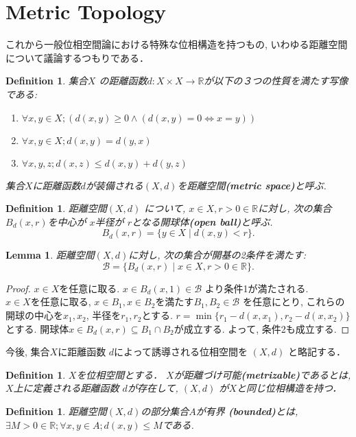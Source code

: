 \documentclass[lualatex]{ltjsbook}
\newtheorem{lemma}[theorem]{Lemma}
\newtheorem{definition}[theorem]{Definition}
\theoremstyle{remark}
\theoremstyle{plain}
\begin{document}
\section{Metric Topology}
これから一般位相空間論における特殊な位相構造を持つもの,  
いわゆる距離空間について議論するつもりである．


\begin{definition}
	集合$X$ の距離函数$d : X \times X \to \mathbb{R}$が以下の３つの性質を満たす写像である:
	\begin{enumerate}
		\item $\forall x  ,  y \in X ; \left( d(x, y) \ge 0 \land \left( d(x, y) = 0  \iff x = y \right) \right)$ 
		\item $\forall x,  y \in X; d(x, y) = d(y, x)$
		\item  $\forall x, y, z ; d(x, z) \le d(x, y) + d(y, z)$
	\end{enumerate}
	集合$X$に距離函数$d$が装備される$(X, d)$を距離空間\textbf{(metric space)}と呼ぶ.
\end{definition}

\begin{definition}
	距離空間$\left( X, d \right) $ について,  $x \in X,  r>0 \in  \mathbb{R}$に対し,  次の集合$B_d (x, r)$を中心が $x$半径が $r$となる開球体\textbf{(open ball)}と呼ぶ.
	 \[
	B_d(x, r) = \{y \in X \mid d(x, y) <r\} 
	.\] 
\end{definition}

\begin{lemma}
	距離空間$(X, d)$に対し,  次の集合が開基の2条件を満たす:
	 \[
	 \mathcal{B} = \{ B_d(x, r)  \mid  x \in X,  r >0 \in \mathbb{R}\} 
	 .\] 
\end{lemma}

\begin{proof}
	$x \in X$を任意に取る.  $x \in B_d(x, 1) \in \mathcal{B}$ より条件1が満たされる.\\
	$x \in X$を任意に取る,   $x \in B_1,  x \in B_2$を満たす$B_1, B_2 \in \mathcal{B}$ を任意にとり,  これらの開球の中心を$x_1, x_2$, 半径を$r_1, r_2$とする. $r = \min \{ r_1 - d(x, x_1),  r_2 -d(x, x_2)\} $ とする. 開球体$ x \in B_d(x, r) \subseteq  B_1 \cap B_2$が成立する. よって,  条件2も成立する.
\end{proof}

今後,  集合$X$に距離函数 $d$によって誘導される位相空間を $\left( X, d \right) $ と略記する．

\begin{definition}
	$X$を位相空間とする． $X$が距離づけ可能\textbf{(metrizable)}であるとは,   $X$上に定義される距離函数 $d$が存在して,   $\left( X, d \right) $ が$X$と同じ位相構造を持つ．
\end{definition}
\begin{definition}
	距離空間$\left( X,  d \right) $の部分集合$A$が有界 \textbf{(bounded)}とは,   $\exists M>0 \in \mathbb{R}; \forall x,  y \in A; d(x, y) \le M$である.
\end{definition}
\end{document}
